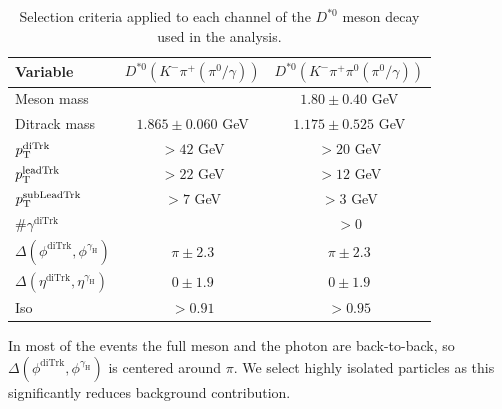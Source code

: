 \begin{table}[!ht]
    \centering
    \begin{tabular}{|l|c|c|}
        \hline
        \cellcolor{lightgray}Variable & \cellcolor{lightgray}$D^{*0}(K^{-}\pi^{+}{\scriptstyle(\pi^{0}/\gamma)})$ & \cellcolor{lightgray}$D^{*0}(K^{-}\pi^{+}\pi^{0}{\scriptstyle(\pi^{0}/\gamma)})$ \\ \hline
        Meson mass                                              &                   &$1.80\pm 0.40$ GeV  \\
        Ditrack mass                                            &$1.865\pm0.060$ GeV&$1.175\pm 0.525$ GeV  \\
        $p_\text{T}^{\text{diTrk}}$                                    &$>42$ GeV          &$>20$ GeV           \\
        $p_\text{T}^{\text{leadTrk}}$                                  &$>22$ GeV          &$>12$ GeV           \\
        $p_\text{T}^{\text{subLeadTrk}}$                               &$>7$ GeV           &$>3$ GeV           \\
        $\#\gamma^{\text{diTrk}}$                               &                   &$>0$               \\
        $\Delta(\phi^{\text{diTrk}}, \phi^{\gamma_\text{H}})$   &$\pi\pm2.3$        &$\pi\pm2.3$        \\
        $\Delta(\eta^{\text{diTrk}}, \eta^{\gamma_\text{H}})$   &$0\pm1.9$          &$0\pm1.9$           \\
        Iso                                                     &$>0.91$            &$>0.95$             \\
        \hline
        \end{tabular}
    \caption{Selection criteria applied to each channel of the $D^{*0}$ meson decay used in the analysis.}
    \label{tab:meson_selection_2}
\end{table}

In most of the events the full meson and the photon are back-to-back, so $\Delta(\phi^{\text{diTrk}}, \phi^{\gamma_\text{H}})$ is centered around $\pi$. We select highly isolated particles as this significantly reduces background contribution.


